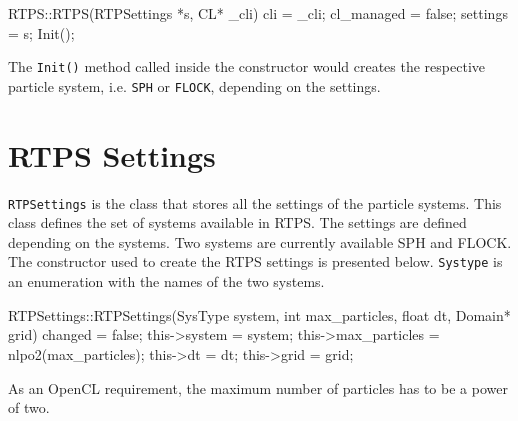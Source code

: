 
\begin{cppcode}{0}
RTPS::RTPS(RTPSettings *s, CL* _cli) 
{
	cli = _cli;
 	cl_managed = false;
	settings = s;
	Init();
}
\end{cppcode}

The \texttt{Init()} method called inside the constructor would creates the respective particle system, i.e. \texttt{SPH} or \texttt{FLOCK}, depending on the settings.

\section{RTPS Settings}\label{rtpsettings}
\texttt{RTPSettings} is the class that stores all the settings of the particle systems. This class defines the set of systems available in RTPS. The settings are defined depending on the systems. Two systems are currently available SPH and FLOCK. The constructor used to create the RTPS settings is presented below. \texttt{Systype} is an enumeration with the names of the two systems. 


\begin{cppcode}{0}
RTPSettings::RTPSettings(SysType system, int max_particles, float dt, Domain* grid)
{
	changed = false;
	this->system = system;
	this->max_particles = nlpo2(max_particles);
	this->dt = dt;
	this->grid = grid;
}
\end{cppcode}

As an OpenCL requirement, the maximum number of particles has to be a power of two. 

